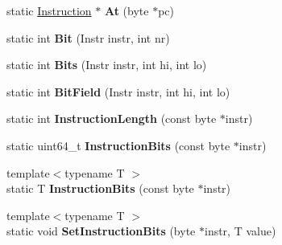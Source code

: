 \begin{DoxyCompactItemize}
\item 
static \hyperlink{classv8_1_1internal_1_1_instruction}{Instruction} $\ast$ {\bfseries At} (byte $\ast$pc)\hypertarget{classv8_1_1internal_1_1_instruction_ababb29269d211ebdc2c9c772e06dc85e}{}\label{classv8_1_1internal_1_1_instruction_ababb29269d211ebdc2c9c772e06dc85e}

\item 
static int {\bfseries Bit} (Instr instr, int nr)\hypertarget{classv8_1_1internal_1_1_instruction_a72f9d7a469c17eea228fe628530157e4}{}\label{classv8_1_1internal_1_1_instruction_a72f9d7a469c17eea228fe628530157e4}

\item 
static int {\bfseries Bits} (Instr instr, int hi, int lo)\hypertarget{classv8_1_1internal_1_1_instruction_af5577086b166e1c6f418c077ab935a9c}{}\label{classv8_1_1internal_1_1_instruction_af5577086b166e1c6f418c077ab935a9c}

\item 
static int {\bfseries Bit\+Field} (Instr instr, int hi, int lo)\hypertarget{classv8_1_1internal_1_1_instruction_a0f8fff80fb9aeeeb77172229c7d73d26}{}\label{classv8_1_1internal_1_1_instruction_a0f8fff80fb9aeeeb77172229c7d73d26}

\item 
static int {\bfseries Instruction\+Length} (const byte $\ast$instr)\hypertarget{classv8_1_1internal_1_1_instruction_adeb3aab3b502018e5af7556915457032}{}\label{classv8_1_1internal_1_1_instruction_adeb3aab3b502018e5af7556915457032}

\item 
static uint64\+\_\+t {\bfseries Instruction\+Bits} (const byte $\ast$instr)\hypertarget{classv8_1_1internal_1_1_instruction_ac984035f4e03b7c91abd5d78d32e4318}{}\label{classv8_1_1internal_1_1_instruction_ac984035f4e03b7c91abd5d78d32e4318}

\item 
{\footnotesize template$<$typename T $>$ }\\static T {\bfseries Instruction\+Bits} (const byte $\ast$instr)\hypertarget{classv8_1_1internal_1_1_instruction_a8fd97b3ac516d7d69066feaa4cc9494b}{}\label{classv8_1_1internal_1_1_instruction_a8fd97b3ac516d7d69066feaa4cc9494b}

\item 
{\footnotesize template$<$typename T $>$ }\\static void {\bfseries Set\+Instruction\+Bits} (byte $\ast$instr, T value)\hypertarget{classv8_1_1internal_1_1_instruction_a6da14f51a73fa72ff9f8c45dbe4c0fb0}{}\label{classv8_1_1internal_1_1_instruction_a6da14f51a73fa72ff9f8c45dbe4c0fb0}


\end{DoxyCompactItemize}
